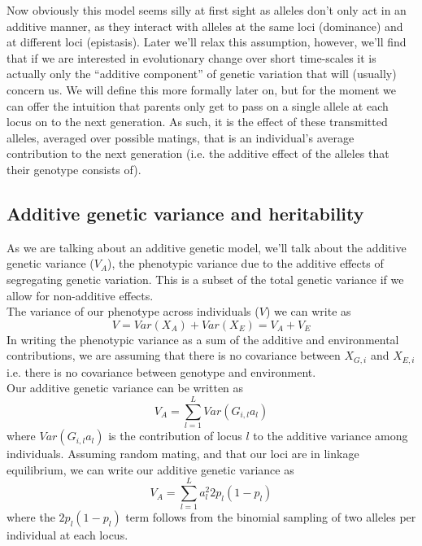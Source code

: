 Now obviously this model seems silly at first sight as alleles don't only act in an additive manner, as they interact with alleles at the same loci (dominance) and at different loci (epistasis). Later we'll relax this assumption, 
however, we'll find that if we are interested in evolutionary change over short time-scales it is actually only the ``additive
component'' of genetic variation that will (usually) concern us. 
We will define this more formally later on, but for the moment 
we can offer the intuition that parents only get to pass on a single allele at each locus on to the next generation. As such, it is the effect of these transmitted alleles, averaged over possible matings, that is an individual's average contribution  to the next generation (i.e. the additive effect of the alleles that their genotype consists of).



\subsection{Additive genetic variance and heritability}
As we are talking about an additive genetic model, we'll talk about the additive genetic variance ($V_A$), the phenotypic variance due to the additive effects of segregating genetic variation. This is a subset of the total genetic
variance if we allow for non-additive effects. \\

The variance of our phenotype across individuals ($V$) we can write as
\begin{equation}
V = Var(X_A) + Var(X_E) = V_A+V_E
\end{equation}
In writing the phenotypic variance as a sum of the additive and environmental contributions, we are assuming that there is no covariance between $X_{G,i}$ and $X_{E,i}$ i.e. there is no covariance between genotype and environment. \\

Our additive genetic variance can be written as
\begin{equation}
V_A = \sum_{l=1}^L Var(G_{i,l} a_{l})
\end{equation}
where $Var(G_{i,l} a_{l})$ is the contribution of locus $l$ to the additive
variance among individuals. Assuming random mating, and that our loci are in linkage equilibrium, we can write our additive genetic variance as
\begin{equation}
V_A = \sum_{l=1}^L a_{l}^2 2 p_l(1-p_l)  \label{eqn:VA}
\end{equation}
where the $ 2 p_l(1-p_l)$ term follows from the binomial sampling of two alleles per individual at each locus. \\

